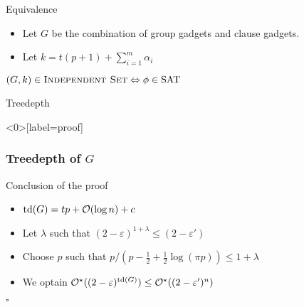 \begin{frame}{Equivalence}
    \centering
    \begin{itemize}
        \item Let $G$ be the combination of group gadgets and clause gadgets.
        \item Let $k = t(p+1)+ \sum_{i = 1}^m \alpha_i$
    \end{itemize}

    \vspace{1cm}

    $(G, k) \in \textsc{Independent Set} \Leftrightarrow \phi \in \text{SAT}$
\end{frame}

\begin{frame}{Treedepth}
    \centering
    
\end{frame}

\begin{frame}<0>[label=proof]
    \frametitle{Treedepth of $G$}
\end{frame}


\begin{frame}{Conclusion of the proof}
    \begin{itemize}
        \item $\text{td}(G) = tp + \mathcal{O}(\log n) + c$
        \item Let $\lambda$ such that $(2 - \varepsilon)^{1 + \lambda} \leq (2 - \varepsilon')$
        \item Choose $p$ such that $p/(p - \frac{1}{2} + \frac{1}{2} \log(\pi p)) \leq 1 + \lambda$
        \item We optain $\mathcal{O}^\star((2 - \varepsilon)^{\text{td}(G)}) \leq \mathcal{O}^\star((2 - \varepsilon')^n)$
    \end{itemize}

    \hfill$\square$
\end{frame}